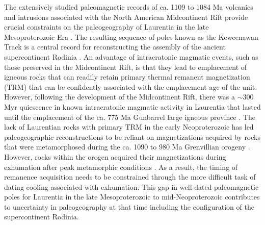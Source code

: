 The extensively studied paleomagnetic records of ca. 1109 to 1084 Ma volcanics and intrusions associated with the North American Midcontinent Rift provide crucial constraints on the paleogeography of Laurentia in the late Mesoproterozoic Era \citep{Halls1982a, Fairchild2017a, Swanson-Hysell2019a}. The resulting sequence of poles known as the Keweenawan Track is a central record for reconstructing the assembly of the ancient supercontinent Rodinia \citep{Evans2021b}. An advantage of intracratonic magmatic events, such as those preserved in the Midcontinent Rift, is that they lead to emplacement of igneous rocks that can readily retain primary thermal remanent magnetization (TRM) that can be confidently associated with the emplacement age of the unit. However, following the development of the Midcontinent Rift, there was a $\sim$300 Myr quiescence in known intracratonic magmatic activity in Laurentia that lasted until the emplacement of the ca. 775 Ma Gunbarrel large igneous province \citep{Harlan2003a, Mackinder2019a, Swanson-Hysell2021c}. The lack of Laurentian rocks with primary TRM in the early Neoproterozoic has led paleogeographic reconstructions to be reliant on magnetizations acquired by rocks that were metamorphosed during the ca. 1090 to 980 Ma Grenvillian orogeny \citep{Rivers2008a, Rivers2012a, Swanson-Hysell2023a}. However, rocks within the orogen acquired their magnetizations during exhumation after peak metamorphic conditions \citep{McWilliams1975a}. As a result, the timing of remanence acquisition needs to be constrained through the more difficult task of dating cooling associated with exhumation. This gap in well-dated paleomagnetic poles for Laurentia in the late Mesoproterozoic to mid-Neoproterozoic contributes to uncertainty in paleogeography at that time including the configuration of the supercontinent Rodinia.

